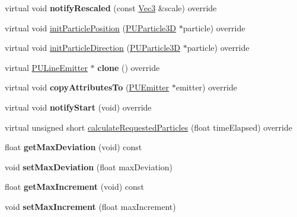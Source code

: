 \begin{DoxyCompactItemize}
virtual void {\bfseries notify\+Rescaled} (const \hyperlink{classVec3}{Vec3} \&scale) override
\item 
virtual void \hyperlink{classPULineEmitter_a45329bb73318a8b5c356e7ae3ce0da95}{init\+Particle\+Position} (\hyperlink{structPUParticle3D}{P\+U\+Particle3D} $\ast$particle) override
\item 
virtual void \hyperlink{classPULineEmitter_a9c2cf66c33150c25e546faf6cf3244aa}{init\+Particle\+Direction} (\hyperlink{structPUParticle3D}{P\+U\+Particle3D} $\ast$particle) override
\item 
\mbox{\label{classPULineEmitter_a533980ed95608e5b55e79a73c065e3e5}} 
virtual \hyperlink{classPULineEmitter}{P\+U\+Line\+Emitter} $\ast$ {\bfseries clone} () override
\item 
\mbox{\label{classPULineEmitter_a518aef30686ad8de34dd63120ac2187d}} 
virtual void {\bfseries copy\+Attributes\+To} (\hyperlink{classPUEmitter}{P\+U\+Emitter} $\ast$emitter) override
\item 
\mbox{\label{classPULineEmitter_a4e89c2efa8e477e1d69518fe19386511}} 
virtual void {\bfseries notify\+Start} (void) override
\item 
virtual unsigned short \hyperlink{classPULineEmitter_a801b15386630dc636dfb6e3f3f74cb06}{calculate\+Requested\+Particles} (float time\+Elapsed) override
\item 
\mbox{\label{classPULineEmitter_ac1ea748c05897d571c4b15698c63c976}} 
float {\bfseries get\+Max\+Deviation} (void) const
\item 
\mbox{\label{classPULineEmitter_a983d1d81f61cf7b972767288dc8b1726}} 
void {\bfseries set\+Max\+Deviation} (float max\+Deviation)
\item 
\mbox{\label{classPULineEmitter_aa400da243d45073bdf9d5de755bd4859}} 
float {\bfseries get\+Max\+Increment} (void) const
\item 
\mbox{\label{classPULineEmitter_a6e1122f6cfdcbd76e09e5d7261c35862}} 
void {\bfseries set\+Max\+Increment} (float max\+Increment)
\item 
\mbox{\label{classPULineEmitter_a37ce76d1aa21f5cd2dc0f83bea2b8240}} 

\end{DoxyCompactItemize}

